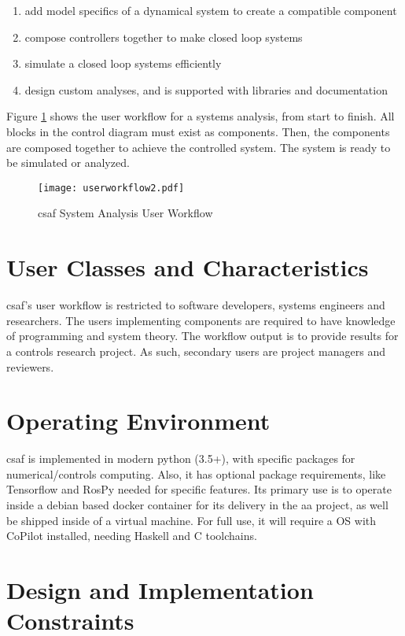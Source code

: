 \begin{enumerate}
\item add model specifics of a dynamical system to create a compatible component
\item compose controllers together to make closed loop systems
\item simulate a closed loop systems efficiently
\item design custom analyses, and is supported with libraries and documentation
\end{enumerate}

Figure \ref{fig:uworkflow} shows the user workflow for a systems analysis, from start to finish. All blocks in the control diagram must exist as components. Then, the components are composed together to achieve the controlled system. The system is ready to be simulated or analyzed.

\begin{figure}
\centering
\texttt{[image: userworkflow2.pdf]}
\caption{ \acrshort{csaf} System Analysis User Workflow }
\label{fig:uworkflow}
\end{figure}

\section{User Classes and Characteristics}

\acrshort{csaf}'s user workflow is restricted to software developers, systems engineers and researchers. The users implementing components are required to have knowledge of programming and system theory. The workflow output is to provide results for a controls research project. As such, secondary users are project managers and reviewers. 


\section{Operating Environment}

\acrshort{csaf} is implemented in modern python (3.5+), with specific packages for numerical/controls 
computing. Also, it has optional package requirements, like Tensorflow and RosPy needed for specific 
features. Its primary use is to operate inside a debian based docker container for its delivery in the 
\acrlong{aa} project, as well be shipped inside of a virtual machine. For full use, it will require a OS with 
CoPilot installed, needing Haskell and C toolchains.  

\section{Design and Implementation Constraints}

